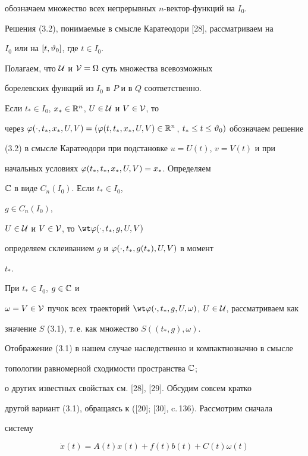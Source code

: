 обозначаем множество всех непрерывных $n$-вектор-функций на ${I_0}$.


Решения (3.2), понимаемые в смысле Каратеодори [28], рассматриваем на


$I_0$ или на $[t,{{\vartheta}_0}]$, где $t \in {I_0}$.


Полагаем, что ${\cal U}$ и ${\cal V} = \Omega$ суть множества всевозможных


борелевских функций из $I_0$ в $P$ и в $Q$ соответственно.


Если ${t_*} \in {I_0}$, ${x_*} \in


{{\Bbb R}^n}$, $U \in {\cal U}$ и $V \in {\cal V}$, то


через ${\vp}(\cdot,{t_*},{x_*},U,V) = ({\vp}(t,{t_*},{x_*},U,V) \in


{{\Bbb R}^n}$, ${t_*} \le t \le {{\vt}_0})$ обозначаем решение


(3.2) в смысле Каратеодори при подстановке $u = {U(t)}$, $v = {V(t)}$ и при


начальных условиях ${\varphi}({t_*},{t_*},{x_*},U,V) = {x_*}$. Определяем


${\Bbb C}$ в виде ${C_n}(I_0)$. Если ${t_*} \in {I_0}$,


$g \in {C_n}(I_0)$,


$U \in {\cal U}$ и $V \in {\cal V}$, то ${\wt \vp}(\cdot,{t_*},g,U,V)$


определяем склеиванием $g$ и ${\varphi}(\cdot,{t_*},{g(t_*)},U,V)$ в момент


${t_*}$.


При ${t_*} \in {I_0}$, $g \in {\Bbb C}$ и


$\omega = V \in {\cal V}$ пучок всех траекторий ${\wt \vp}(\cdot,


{t_*},g,U,\omega)$, $U \in {\cal U}$, рассматриваем как


значение $S$ (3.1), т.\,е. как множество $S(({t_*},g),\omega)$.


Отображение (3.1) в нашем случае наследственно и компактнозначно в смысле


топологии равномерной сходимости пространства ${\Bbb C}$;


о других известных свойствах см. [28], [29]. Обсудим совсем кратко


другой вариант (3.1), обращаясь к ([20]; [30], c.\,136). Рассмотрим сначала


систему


\begin{equation}


\Dot x (t) = {A(t)}{x(t)} + {f(t)}{b(t)} +


{C(t)}{{\omega}(t)}


\end{equation}


